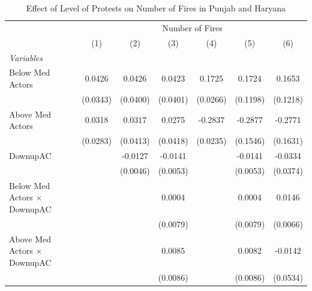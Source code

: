 
\begin{table}[htbp]
   \caption{\label{tab:protest_treat_main} Effect of Level of Protests on Number of Fires in Punjab and Haryana}
   \centering
   \begin{tabular}{lcccccc}
      \tabularnewline \midrule \midrule
       & \multicolumn{6}{c}{Number of Fires}\\
                                                                          & (1)           & (2)           & (3)           & (4)           & (5)           & (6)\\  
      \midrule
      \emph{Variables}\\
      Below Med Actors                                                    & 0.0426        & 0.0426        & 0.0423        & 0.1725        & 0.1724        & 0.1653\\   
                                                                          & (0.0343)      & (0.0400)      & (0.0401)      & (0.0266)      & (0.1198)      & (0.1218)\\   
      Above Med Actors                                                    & 0.0318        & 0.0317        & 0.0275        & -0.2837       & -0.2877       & -0.2771\\   
                                                                          & (0.0283)      & (0.0413)      & (0.0418)      & (0.0235)      & (0.1546)      & (0.1631)\\   
      DownupAC                                                            &               & -0.0127       & -0.0141       &               & -0.0141       & -0.0334\\   
                                                                          &               & (0.0046)      & (0.0053)      &               & (0.0053)      & (0.0374)\\   
      Below Med Actors $\times$ DownupAC                                  &               &               & 0.0004        &               & 0.0004        & 0.0146\\   
                                                                          &               &               & (0.0079)      &               & (0.0079)      & (0.0066)\\   
      Above Med Actors $\times$ DownupAC                                  &               &               & 0.0085        &               & 0.0082        & -0.0142\\   
                                                                          &               &               & (0.0086)      &               & (0.0086)      & (0.0534)\\   

\end{tabular}
\end{table}
